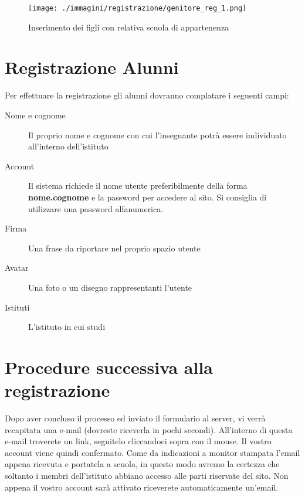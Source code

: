 \begin{figure}[H]
 \centering
 \texttt{[image: ./immagini/registrazione/genitore\_reg\_1.png]}
 \caption{Inserimento dei figli con relativa scuola di appartenenza}
 \label{fig:reg_gen1}
\end{figure}

\section{Registrazione Alunni}

Per effettuare la registrazione gli alunni dovranno complatare i seguenti campi:

\begin{description}
 \item[Nome e cognome] Il proprio nome e cognome con cui l'insegnante potrà essere individuato all'interno dell'istituto
\item[Account] Il sistema richiede il nome utente preferibilmente della forma \textbf{nome.cognome} e la password per accedere al sito. Si consiglia di utilizzare una password alfanumerica.
\item[Firma] Una frase da riportare nel proprio spazio utente
\item[Avatar] Una foto o un disegno rappresentanti l'utente
\item[Istituti] L'istituto in cui studi

\end{description}
\section{Procedure successiva alla registrazione}

Dopo aver concluso il processo ed inviato il formulario al server, vi verrà recapitata una e-mail (dovreste riceverla in pochi secondi). All'interno di questa e-mail troverete un link, seguitelo cliccandoci sopra con il mouse. Il vostro account viene quindi confermato. Come da indicazioni a monitor stampata l'email appena ricevuta e portatela a scuola, in questo modo avremo la certezza che soltanto i membri dell'istituto abbiano accesso alle parti riservate del sito. Non appena il vostro account sarà attivato riceverete automaticamente un'email.


